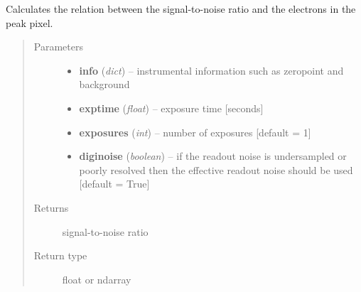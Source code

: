 \documentclass[a4paper,12pt,english]{sphinxmanual}
\begin{document}

\begin{fulllineitems}
\label{ETC:analysis.ETC.SNRproptoPeak}
Calculates the relation between the signal-to-noise ratio and the electrons in the peak pixel.
\begin{quote}\begin{description}
\item[{Parameters}] \leavevmode\begin{itemize}
\item {} 
\textbf{info} (\emph{dict}) -- instrumental information such as zeropoint and background

\item {} 
\textbf{exptime} (\emph{float}) -- exposure time {[}seconds{]}

\item {} 
\textbf{exposures} (\emph{int}) -- number of exposures {[}default = 1{]}

\item {} 
\textbf{diginoise} (\emph{boolean}) -- if the readout noise is undersampled or poorly resolved then the effective readout noise
should be used {[}default = True{]}

\end{itemize}

\item[{Returns}] \leavevmode
signal-to-noise ratio

\item[{Return type}] \leavevmode
float or ndarray

\end{description}\end{quote}

\end{fulllineitems}

\end{document}
